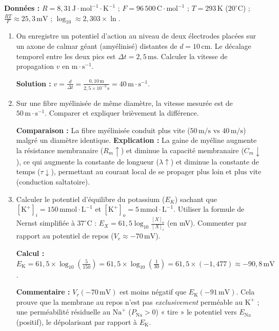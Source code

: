 \documentclass[11pt]{article}
\begin{document}
\begin{exercice}
\textbf{Données :} $R = 8,31\,\text{J}\cdot\text{mol}^{-1}\cdot\text{K}^{-1}$ ; $F = 96\,500\,\text{C}\cdot\text{mol}^{-1}$ ; $T = 293\,\text{K}$ ($20^\circ\text{C}$) ; $\frac{RT}{F} \approx 25,3\,\text{mV}$ ; $\log_{10} \approx 2,303 \times \ln$.
\begin{enumerate}
\item On enregistre un potentiel d'action au niveau de deux électrodes placées sur un axone de calmar géant (amyélinisé) distantes de $d = 10\,\text{cm}$. Le décalage temporel entre les deux pics est $\Delta t = 2,5\,\text{ms}$. Calculer la vitesse de propagation $v$ en $\text{m}\cdot\text{s}^{-1}$.
\par \textbf{Solution :} $v = \frac{d}{\Delta t} = \frac{0,10\,\text{m}}{2,5 \times 10^{-3}\,\text{s}} = 40\,\text{m}\cdot\text{s}^{-1}$.
\item Sur une fibre myélinisée de même diamètre, la vitesse mesurée est de $50\,\text{m}\cdot\text{s}^{-1}$. Comparer et expliquer brièvement la différence.
\par \textbf{Comparaison :} La fibre myélinisée conduit plus vite ($50\,\text{m/s}$ vs $40\,\text{m/s}$) malgré un diamètre identique. \textbf{Explication :} La gaine de myéline augmente la résistance membranaire ($R_m \uparrow$) et diminue la capacité membranaire ($C_m \downarrow$), ce qui augmente la constante de longueur ($\lambda \uparrow$) et diminue la constante de temps ($\tau \downarrow$), permettant au courant local de se propager plus loin et plus vite (conduction saltatoire).
\item Calculer le potentiel d'équilibre du potassium ($E_K$) sachant que $[\text{K}^+]_i = 150\,\text{mmol}\cdot\text{L}^{-1}$ et $[\text{K}^+]_o = 5\,\text{mmol}\cdot\text{L}^{-1}$. Utiliser la formule de Nernst simplifiée à $37^\circ\text{C}$ : $E_X = 61,5 \log_{10}\frac{[X]_o}{[X]_i}$ (en mV). Commenter par rapport au potentiel de repos ($V_r \approx -70\,\text{mV}$).
\par \textbf{Calcul :} $E_{\text{K}} = 61,5 \times \log_{10}\left(\frac{5}{150}\right) = 61,5 \times \log_{10}\left(\frac{1}{30}\right) = 61,5 \times (-1,477) \approx -90,8\,\text{mV}$.
\par \textbf{Commentaire :} $V_r (-70\,\text{mV})$ est moins négatif que $E_{\text{K}} (-91\,\text{mV})$. Cela prouve que la membrane au repos n'est pas \emph{exclusivement} perméable au $\text{K}^+$ ; une perméabilité résiduelle au $\text{Na}^+$ ($P_{\text{Na}} > 0$) « tire » le potentiel vers $E_{\text{Na}}$ (positif), le dépolarisant par rapport à $E_{\text{K}}$.
\end{enumerate}
\end{exercice}
\end{document}
